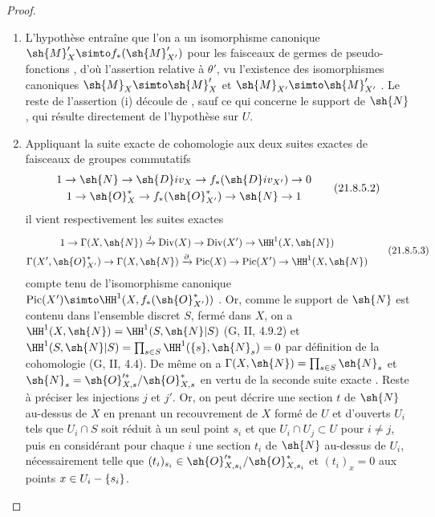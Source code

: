 \begin{proof}
\begin{enumerate}[label=(\roman*)]
  \item L'hypothèse entraîne que l'on a un isomorphisme canonique $\sh{M}'_X\simto f_*(\sh{M}'_{X'})$ pour les faisceaux de germes de pseudo-fonctions , d'où l'assertion relative à $\theta'$, vu l'existence des isomorphismes canoniques $\sh{M}_X\simto\sh{M}'_X$ et $\sh{M}_{X'}\simto\sh{M}'_{X'}$ .
Le reste de l'assertion (i) découle de , sauf ce qui concerne le support de $\sh{N}$, qui résulte directement de l'hypothèse sur $U$.

  \item Appliquant la suite exacte de cohomologie aux deux suites exactes de faisceaux de groupes commutatifs
\[
\label{IV.21.8.5.2}
\begin{gathered}
  1\to\sh{N}\to\sh{D}iv_X\to f_*(\sh{D}iv_{X'})\to0\\
  1\to\sh{O}^*_X\to f_*(\sh{O}^*_{X'})\to\sh{N}\to1
\end{gathered}
  \tag{21.8.5.2}
\]
il vient respectivement les suites exactes
\[
\label{IV.21.8.5.3}
\begin{gathered}
  1\to\Gamma(X,\sh{N})\xrightarrow{j}\operatorname{Div}(X)\to\operatorname{Div}(X')\to\HH^1(X,\sh{N})\\
  \Gamma(X',\sh{O}^*_{X'})\to\Gamma(X,\sh{N})\xrightarrow{\partial}\operatorname{Pic}(X)\to\operatorname{Pic}(X')\to\HH^1(X,\sh{N})
\end{gathered}
  \tag{21.8.5.3}
\]
compte tenu de l'isomorphisme canonique $\operatorname{Pic}(X')\simto\HH^1(X,f_*(\sh{O}^*_{X'}))$ .
Or, comme le support de $\sh{N}$ est contenu dans l'ensemble discret $S$, fermé dans $X$, on a
$\HH^1(X,\sh{N})=\HH^1(S,\sh{N}|S)$ (G, II, 4.9.2) et $\HH^1(S,\sh{N}|S)=\prod_{s\in S}\HH^1(\{s\},\sh{N}_s)=0$
par définition de la cohomologie (G, II, 4.4).
De même on a $\Gamma(X,\sh{N})=\prod_{s\in S}\sh{N}_s$ et $\sh{N}_s=\sh{O}'^{*}_{X,s}/\sh{O}^*_{X,s}$ en vertu de la seconde suite exacte .
Reste à préciser les injections $j$ et $j'$.
Or, on peut décrire une section $t$ de $\sh{N}$ au-dessus de $X$ en prenant un recouvrement de $X$ formé de $U$ et d'ouverts $U_i$ tels que $U_i\cap S$ soit réduit à un seul point $s_i$ et que $U_i\cap U_j\subset U$ pour $i\neq j$, puis en considérant pour chaque $i$ une section $t_i$ de $\sh{N}$ au-dessus de $U_i$, nécessairement telle que $(t_i)_{s_i}\in\sh{O}'^{*}_{X,s_i}/\sh{O}^*_{X,s_i}$ et $(t_i)_x=0$ aux points $x\in U_i-\{s_i\}$.

\end{enumerate}
\end{proof}
